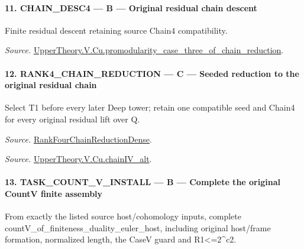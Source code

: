 \documentclass[11pt,a4paper]{article}
\numberwithin{equation}{section}
\theoremstyle{remark}\newtheorem{remark}[theorem]{Remark}
\begin{document}
\paragraph{11. CHAIN\_\allowbreak DESC4 — B — Original residual chain descent}

Finite residual descent retaining source Chain4 compatibility.

\emph{Source.} \href{https://github.com/CocoSgt/riemann-hypothesis-lean/blob/7cbf7a0c32fca1badf05931879a37c3f8a2b03b4/src/Development/AutomorphicArithmetic/AutomorphicVarieties/ModularityArgument/ThresholdArguments/DenseThresholdCases/PromodularityCaseThreeOfLemmas.lean#L131-L153}{UpperTheory.V.Cu.promodularity\_\allowbreak case\_\allowbreak three\_\allowbreak of\_\allowbreak chain\_\allowbreak reduction}.



\paragraph{12. RANK4\_\allowbreak CHAIN\_\allowbreak REDUCTION — C — Seeded reduction to the original residual chain}

Select T1 before every later Deep tower; retain one compatible seed and Chain4 for every original residual lift over Q.

\emph{Source.} \href{https://github.com/CocoSgt/riemann-hypothesis-lean/blob/7cbf7a0c32fca1badf05931879a37c3f8a2b03b4/src/Development/AutomorphicArithmetic/AutomorphicVarieties/ModularityArgument/ThresholdArguments/DenseThresholdCases/PromodularityCaseThree.lean#L33-L39}{RankFourChainReductionDense}.

\emph{Source.} \href{https://github.com/CocoSgt/riemann-hypothesis-lean/blob/7cbf7a0c32fca1badf05931879a37c3f8a2b03b4/src/Development/AutomorphicArithmetic/AutomorphicVarieties/ModularityArgument/ThresholdArguments/DenseThresholdCases/CuPChainIV.lean#L16-L82}{UpperTheory.V.Cu.chainIV\_\allowbreak alt}.



\paragraph{13. TASK\_\allowbreak COUNT\_\allowbreak V\_\allowbreak INSTALL — B — Complete the original CountV finite assembly}

From exactly the listed source host/cohomology inputs, complete countV\_\allowbreak of\_\allowbreak finiteness\_\allowbreak duality\_\allowbreak euler\_\allowbreak host, including original host/frame formation, normalized length, the CaseV guard and R1<=2\textasciicircum{}c2.
\end{document}

